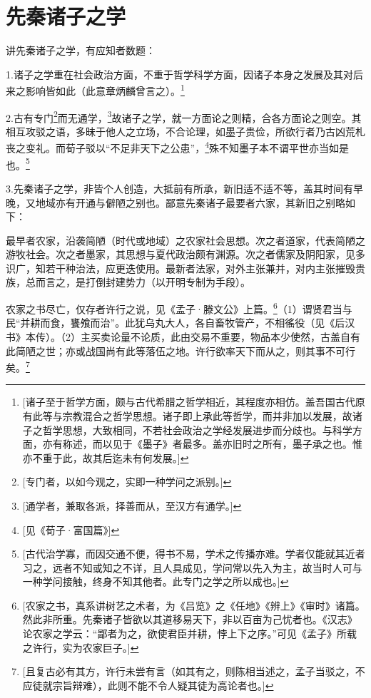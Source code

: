 \chapter{先秦诸子之学}

讲先秦诸子之学，有应知者数题：

1.诸子之学重在社会政治方面，不重于哲学科学方面，因诸子本身之发展及其对后来之影响皆如此（此意章炳麟曾言之）。\footnote{[诸子至于哲学方面，颇与古代希腊之哲学相近，其程度亦相仿。盖吾国古代原有此等与宗教混合之哲学思想。诸子即上承此等哲学，而并非加以发展，故诸子之哲学思想，大致相同，不若社会政治之学经发展进步而分歧也。与科学方面，亦有称述，而以见于《墨子》者最多。盖亦旧时之所有，墨子承之也。惟亦不重于此，故其后迄未有何发展。]}

2.古有专门\footnote{[专门者，以如今观之，实即一种学问之派别。]}而无通学，\footnote{[通学者，兼取各派，择善而从，至汉方有通学。]}故诸子之学，就一方面论之则精，合各方面论之则空。其相互攻驳之语，多昧于他人之立场，不合论理，如墨子贵俭，所欲行者乃古凶荒札丧之变礼。而荀子驳以“不足非天下之公患”，\footnote{[见《荀子·富国篇》]}殊不知墨子本不谓平世亦当如是也。\footnote{[古代治学寡，而因交通不便，得书不易，学术之传播亦难。学者仅能就其近者习之，远者不知或知之不详，且人具成见，学问常以先入为主，故当时人可与一种学问接触，终身不知其他者。此专门之学之所以成也。]}

3.先秦诸子之学，非皆个人创造，大抵前有所承，新旧适不适不等，盖其时间有早晚，又地域亦有开通与僻陋之别也。鄙意先秦诸子最要者六家，其新旧之别略如下：

最早者农家，沿袭简陋（时代或地域）之农家社会思想。次之者道家，代表简陋之游牧社会。次之者墨家，其思想与夏代政治颇有渊源。次之者儒家及阴阳家，见多识广，知若干种治法，应更迭使用。最新者法家，对外主张兼并，对内主张摧毁贵族，总而言之，是打倒封建势力（以开明专制为手段）。

农家之书尽亡，仅存者许行之说，见《孟子·滕文公》上篇。\footnote{[农家之书，真系讲树艺之术者，为《吕览》之《任地》《辨上》《审时》诸篇。然此非所重。先秦诸子皆欲以其道移易天下，非以百亩为己忧者也。《汉志》论农家之学云：“鄙者为之，欲使君臣并耕，悖上下之序。”可见《孟子》所载之许行，实为农家巨子。]}（1）谓贤君当与民“并耕而食，饔飧而治”。此犹乌丸大人，各自畜牧管产，不相徭役（见《后汉书》本传）。（2）主买卖论量不论质，此由交易不重要，物品本少使然，古盖自有此简陋之世；亦或战国尚有此等落伍之地。许行欲率天下而从之，则其事不可行矣。\footnote{[且复古必有其方，许行未尝有言（如其有之，则陈相当述之，孟子当驳之，不应徒就宗旨辩难），此则不能不令人疑其徒为高论者也。]}

